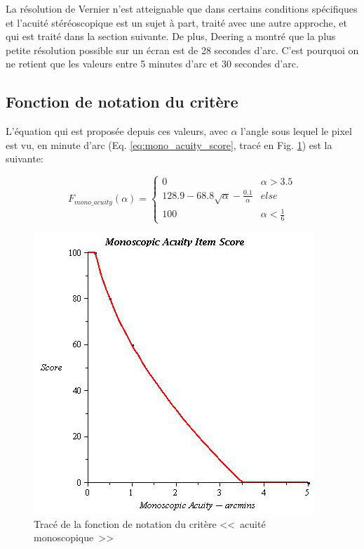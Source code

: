 	\par La résolution de Vernier n'est atteignable que dans certains conditions spécifiques et l'acuité stéréoscopique est un sujet à part, traité avec une autre approche, et qui est traité dans la section suivante. De plus, Deering a montré que la plus petite résolution possible sur un écran est de 28 secondes d'arc\citep{deering_limits_1998}. C'est pourquoi on ne retient que les valeurs entre 5 minutes d'arc et 30 secondes d'arc.
	
	\subsection{Fonction de notation du critère}
	\par L'équation qui est proposée depuis ces valeurs, avec $\alpha$ l'angle sous lequel le pixel est vu, en minute d'arc (Eq. \ref{eq:mono_acuity_score}, tracé en Fig. \ref{fig:score_mono_acuity}) est la suivante:
	
	\begin{equation}
		F_{mono\_acuity}(\alpha) = \begin{cases}
		0 & \alpha > 3.5\\
		128.9 - 68.8 \sqrt{\alpha} - \frac{0.1}{\alpha} & else\\
		100 & \alpha < \frac{1}{6}
		\end{cases}
		\label{eq:mono_acuity_score}
	\end{equation}

	\begin{figure}
		\centering
		\includegraphics[scale=.75]{Figures/AcuityMono}
		\caption{Tracé de la fonction de notation du critère <<~acuité monoscopique~>>}
		\label{fig:score_mono_acuity}
	\end{figure}
	
